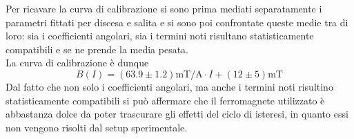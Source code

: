 Per ricavare la curva di calibrazione si sono prima mediati separatamente i parametri fittati
per discesa e salita e si sono poi confrontate queste medie tra di loro:
sia i coefficienti angolari, sia i termini noti risultano statisticamente compatibili e se ne prende la media pesata.\\
La curva di calibrazione è dunque
\begin{equation}
    B(I) = (63.9\pm1.2)\text{mT/A}\cdot I + (12\pm5)\text{mT}
    \label{eq:cal_magn}
\end{equation}
Dal fatto che non solo i coefficienti angolari, ma anche i termini noti risultino
statisticamente compatibili si può affermare che il ferromagnete utilizzato è
abbastanza dolce da poter trascurare gli effetti del ciclo di isteresi, in quanto essi
non vengono risolti dal setup sperimentale.
